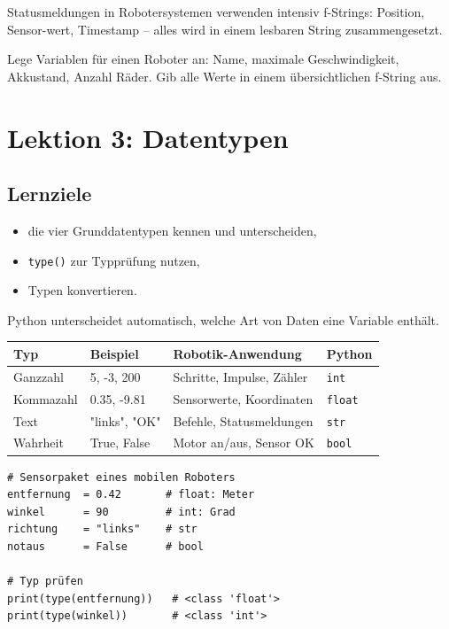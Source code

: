 \begin{praxis}
Statusmeldungen in Robotersystemen verwenden intensiv f-Strings: Position, Sensor-wert, Timestamp -- alles wird in einem lesbaren String zusammengesetzt.
\end{praxis}

\begin{uebung}[title=Übung 1.2: Roboter-Datensatz]
Lege Variablen für einen Roboter an: Name, maximale Geschwindigkeit, Akkustand, Anzahl Räder. Gib alle Werte in einem übersichtlichen f-String aus.
\end{uebung}

\section{Lektion 3: Datentypen}

\subsection*{Lernziele}
\begin{itemize}
    \item die vier Grunddatentypen kennen und unterscheiden,
    \item \texttt{type()} zur Typprüfung nutzen,
    \item Typen konvertieren.
\end{itemize}

Python unterscheidet automatisch, welche Art von Daten eine Variable enthält.

\begin{center}
\begin{tabular}{llll}
\toprule
\textbf{Typ} & \textbf{Beispiel} & \textbf{Robotik-Anwendung} & \textbf{Python} \\
\midrule
Ganzzahl   & 5, -3, 200     & Schritte, Impulse, Zähler  & \texttt{int}   \\
Kommazahl  & 0.35, -9.81    & Sensorwerte, Koordinaten   & \texttt{float} \\
Text       & "links", "OK"  & Befehle, Statusmeldungen   & \texttt{str}   \\
Wahrheit   & True, False    & Motor an/aus, Sensor OK    & \texttt{bool}  \\
\bottomrule
\end{tabular}
\end{center}

\begin{lstlisting}
# Sensorpaket eines mobilen Roboters
entfernung  = 0.42       # float: Meter
winkel      = 90         # int: Grad
richtung    = "links"    # str
notaus      = False      # bool

# Typ prüfen
print(type(entfernung))   # <class 'float'>
print(type(winkel))       # <class 'int'>
\end{lstlisting}

